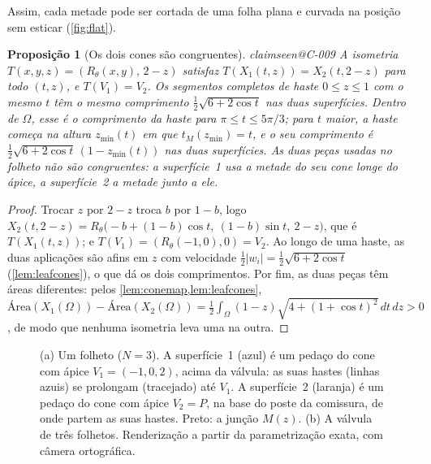 \documentclass[11pt,a4paper]{article}
\makeatletter
\theoremstyle{plain}
\newtheorem{proposition}[theorem]{Proposição}
\theoremstyle{remark}
\newcommand{\claim}[1]{\ifcsname claimseen@#1\endcsname\else\expandafter\gdef\csname claimseen@#1\endcsname{}\label{claim:#1}\fi}
\makeatother
\begin{document}
Assim, cada metade pode ser cortada de uma folha plana e curvada na posição sem esticar (\cref{fig:flat}).

\begin{proposition}[Os dois cones são congruentes]\label{prop:congruent}\claim{C-009}
A isometria $T(x,y,z)=(R_\theta(x,y),\,2-z)$ satisfaz $T(X_1(t,z))=X_2(t,2-z)$ para todo $(t,z)$, e $T(V_1)=V_2$. Os segmentos
completos de haste $0\le z\le1$ com o mesmo $t$ têm o mesmo comprimento $\tfrac12\sqrt{6+2\cos t}$ nas duas superfícies.
Dentro de $\Omega$, esse é o comprimento da haste para $\pi\le t\le5\pi/3$; para $t$ maior, a haste começa na altura
$z_{\min}(t)$ em que $t_M(z_{\min})=t$, e o seu comprimento é $\tfrac12\sqrt{6+2\cos t}\,(1-z_{\min}(t))$ nas duas
superfícies. As duas \emph{peças} usadas no folheto não são congruentes: a superfície~1 usa a metade do seu cone longe do
ápice, a superfície~2 a metade junto a ele.
\end{proposition}
\begin{proof}
Trocar $z$ por $2-z$ troca $b$ por $1-b$, logo $X_2(t,2-z)=R_\theta\big(-b+(1-b)\cos t,\ (1-b)\sin t,\ 2-z\big)$, que é
$T(X_1(t,z))$; e $T(V_1)=(R_\theta(-1,0),0)=V_2$. Ao longo de uma haste, as duas aplicações são afins em $z$ com velocidade
$\frac12|w_i|=\frac12\sqrt{6+2\cos t}$ (\cref{lem:leafcones}), o que dá os dois comprimentos. Por fim, as duas peças têm
áreas diferentes: pelos \cref{lem:conemap,lem:leafcones},
$\mathrm{Área}(X_1(\Omega))-\mathrm{Área}(X_2(\Omega))=\frac12\int_\Omega(1-z)\sqrt{4+(1+\cos t)^2}\,dt\,dz>0$, de modo que
nenhuma isometria leva uma na outra.
\end{proof}

\begin{figure}[t]\centering

\caption{(a) Um folheto ($N=3$). A superfície~1 (azul) é um pedaço do cone com ápice $V_1=(-1,0,2)$, acima da válvula: as suas
hastes (linhas azuis) se prolongam (tracejado) até $V_1$. A superfície~2 (laranja) é um pedaço do cone com ápice $V_2=P$, na
base do poste da comissura, de onde partem as suas hastes. Preto: a junção $M(z)$. (b) A válvula de três folhetos. Renderização
a partir da parametrização exata, com câmera ortográfica.}
\label{fig:leaflet}
\end{figure}
\end{document}
